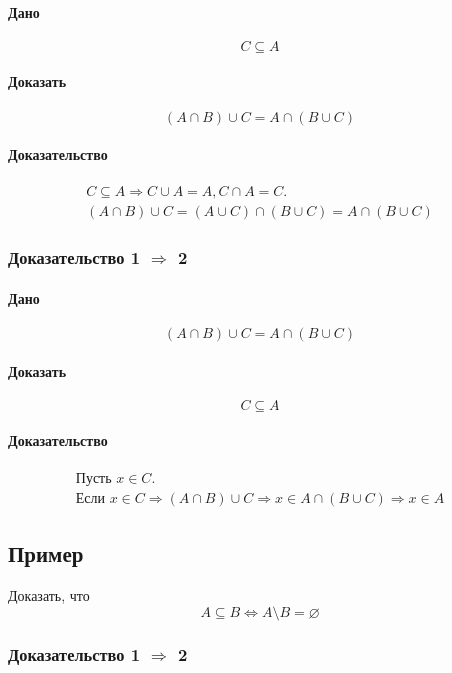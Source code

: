 \documentclass{article}
\begin{document}
\paragraph{Дано}
\[
C \subseteq A
\]

\paragraph{Доказать}
\[
    (A \cap B) \cup C = A \cap (B \cup C)
\]

\paragraph{Доказательство}
\begin{gather*}
    C \subseteq A \Rightarrow C \cup A = A, C \cap A = C. \\
    (A \cap B) \cup C = (A \cup C) \cap (B \cup C) = A \cap (B \cup C)
\end{gather*}


\subsubsection{Доказательство 1 $\Rightarrow$ 2}
\paragraph{Дано}
\[
    (A \cap B) \cup C = A \cap (B \cup C)
\]

\paragraph{Доказать}
\[
    C \subseteq A
\]

\paragraph{Доказательство}
\begin{gather*}
    \text{Пусть } x \in C. \\
    \text{Если } x \in C \Rightarrow (A \cap B) \cup C \Rightarrow x \in A \cap (B \cup C) \Rightarrow x \in A
\end{gather*}


\subsection{Пример}
Доказать, что
\[
    A \subseteq B \Leftrightarrow A \setminus B = \varnothing
\]

\subsubsection{Доказательство 1 $\Rightarrow$ 2}
\end{document}
